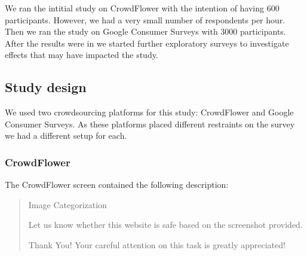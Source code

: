 \documentclass[twoside,letterpaper]{soups}
\begin{document}
We ran the intitial study on CrowdFlower with the intention of having 600 participants. However, we had a very small number of respondents per hour. Then we ran the study on Google Consumer Surveys with 3000 participants. After the results were in we started further exploratory surveys to investigate effects that may have impacted the study. %


\subsection{Study design}



We used two crowdsourcing platforms for this study: CrowdFlower and Google Consumer Surveys. As these platforms placed different restraints on the survey we had a different setup for each.



\subsubsection{CrowdFlower}

The CrowdFlower screen contained the following description:
\begin{quote}
Image Categorization

Let us know whether this website is safe based on the screenshot provided.

Thank You! Your careful attention on this task is greatly appreciated!
\end{quote}
\end{document}
